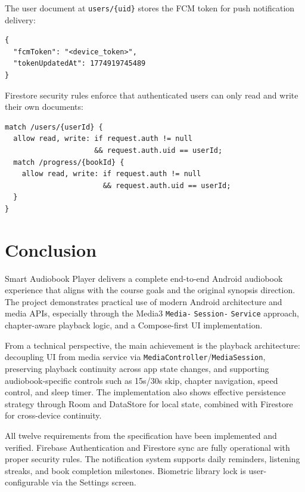\documentclass[11pt,a4paper]{article}
\begin{document}
The user document at \texttt{users/\{uid\}} stores the FCM token for push notification delivery:

\begin{lstlisting}
{
  "fcmToken": "<device_token>",
  "tokenUpdatedAt": 1774919745489
}
\end{lstlisting}

Firestore security rules enforce that authenticated users can only read and write their own documents:

\begin{lstlisting}
match /users/{userId} {
  allow read, write: if request.auth != null
                     && request.auth.uid == userId;
  match /progress/{bookId} {
    allow read, write: if request.auth != null
                       && request.auth.uid == userId;
  }
}
\end{lstlisting}

\section{Conclusion}

Smart Audiobook Player delivers a complete end-to-end Android audiobook experience that aligns with the course goals and the original synopsis direction. The project demonstrates practical use of modern Android architecture and media APIs, especially through the Media3 \texttt{Media-} \texttt{Session-} \texttt{Service} approach, chapter-aware playback logic, and a Compose-first UI implementation.

From a technical perspective, the main achievement is the playback architecture: decoupling UI from media service via \texttt{MediaController}/\texttt{MediaSession}, preserving playback continuity across app state changes, and supporting audiobook-specific controls such as 15s/30s skip, chapter navigation, speed control, and sleep timer. The implementation also shows effective persistence strategy through Room and DataStore for local state, combined with Firestore for cross-device continuity.

All twelve requirements from the specification have been implemented and verified. Firebase Authentication and Firestore sync are fully operational with proper security rules. The notification system supports daily reminders, listening streaks, and book completion milestones. Biometric library lock is user-configurable via the Settings screen.
\end{document}
